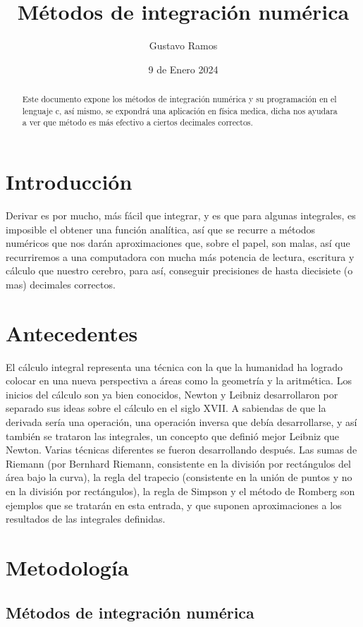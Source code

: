 \documentclass[10pt]{article}
\title{Métodos de integración numérica}
\author{Gustavo Ramos}
\date{9 de Enero 2024}
\begin{document}
	\maketitle
	\begin{abstract}
		Este documento expone los métodos de integración numérica y su programación en el lenguaje c, así mismo, se expondrá una aplicación en física medica, dicha nos ayudara a ver que método es más efectivo a ciertos decimales correctos.
	\end{abstract}
	\newpage
	\tableofcontents
	\newpage
	\begin{multicols}{2}
		\section{Introducción}
		Derivar es por mucho, más fácil que integrar, y es que para algunas integrales, es imposible el obtener una función analítica, así que se recurre a métodos numéricos que nos darán aproximaciones que, sobre el papel, son malas, así que recurriremos a una computadora con mucha más potencia de lectura, escritura y cálculo que nuestro cerebro, para así, conseguir precisiones de hasta diecisiete (o mas) decimales correctos.
		\section{Antecedentes}
		El cálculo integral representa una técnica con la que la humanidad ha logrado colocar en una nueva perspectiva a áreas como la geometría y la aritmética. Los inicios del cálculo son ya bien conocidos, Newton y Leibniz desarrollaron por separado sus ideas sobre el cálculo en el siglo XVII. A sabiendas de que la derivada sería una operación, una operación inversa que debía desarrollarse, y así también se trataron las integrales, un concepto que definió mejor Leibniz que Newton. Varias técnicas diferentes se fueron desarrollando después. Las sumas de Riemann (por Bernhard Riemann, consistente en la división por rectángulos del área bajo la curva), la regla del trapecio (consistente en la unión de puntos y no en la división por rectángulos), la regla de Simpson y el método de Romberg son ejemplos que se tratarán en esta entrada, y que suponen aproximaciones a los resultados de las integrales definidas.
		\section{Metodología}
		\subsection{Métodos de integración numérica}

\end{multicols}
\end{document}
